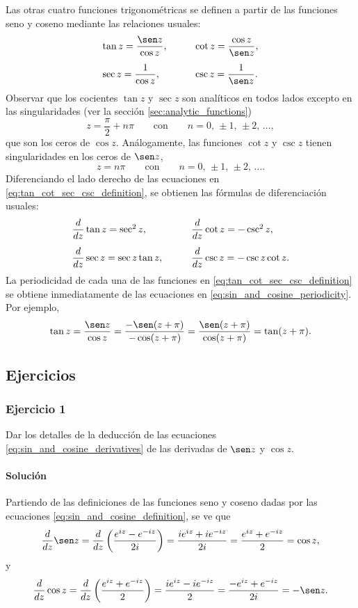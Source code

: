 \documentclass[a4paper]{report}
\begin{document}
Las otras cuatro funciones trigonométricas se definen a partir de las funciones seno y coseno mediante las relaciones usuales:
\begin{equation}\label{eq:tan_cot_sec_csc_definition}
 \begin{array}{ll}
  \tan z=\dfrac{\sen z}{\cos z}, &\qquad\cot z=\dfrac{\cos z}{\sen z},\\[\bigskipamount]
  \sec z=\dfrac{1}{\cos z}, &\qquad\csc z=\dfrac{1}{\sen z}. 
 \end{array} 
\end{equation}
Observar que los cocientes \(\tan z\) y \(\sec z\) son analíticos en todos lados excepto en las singularidades (ver la sección \ref{sec:analytic_functions})
\[
 z=\frac{\pi}{2}+n\pi
 \qquad\textrm{con}\qquad 
 n=0,\,\pm1,\,\pm2,\,\dots,
\]
que son los ceros de \(\cos z\). Análogamente, las funciones \(\cot z\) y \(\csc z\) tienen singularidades en los ceros de \(\sen z\),
\[
 z=n\pi
 \qquad\textrm{con}\qquad 
 n=0,\,\pm1,\,\pm2,\,\dots.
\]
Diferenciando el lado derecho de las ecuaciones en \ref{eq:tan_cot_sec_csc_definition}, se obtienen las fórmulas de diferenciación usuales:
\begin{equation}\label{eq:tan_cot_sec_csc_derivatives}
 \begin{array}{ll}
  \dfrac{d}{dz}\tan z=\sec^2z, &\qquad\dfrac{d}{dz}\cot z=-\csc^2z,\\[\bigskipamount]
  \dfrac{d}{dz}\sec z=\sec z\tan z, &\qquad\dfrac{d}{dz}\csc z=-\csc z\cot z. 
 \end{array} 
\end{equation}
La periodicidad de cada una de las funciones en \ref{eq:tan_cot_sec_csc_definition} se obtiene inmediatamente de las ecuaciones en \ref{eq:sin_and_cosine_periodicity}. Por ejemplo,
\[
 \tan z=\frac{\sen z}{\cos z}=\frac{-\sen(z+\pi)}{-\cos(z+\pi)}=\frac{\sen(z+\pi)}{\cos(z+\pi)}=\tan(z+\pi).
\]

\subsection*{Ejercicios}

\subsubsection{Ejercicio 1}

Dar los detalles de la deducción de las ecuaciones \ref{eq:sin_and_cosine_derivatives} de las derivadas de \(\sen z\) y \(\cos z\).

\paragraph{Solución} Partiendo de las definiciones de las funciones seno y coseno dadas por las ecuaciones \ref{eq:sin_and_cosine_definition}, se ve que 
\[
 \frac{d}{dz}\sen z=\frac{d}{dz}\left(\frac{e^{iz}-e^{-iz}}{2i}\right)
 =\frac{ie^{iz}+ie^{-iz}}{2i}=\frac{e^{iz}+e^{-iz}}{2}=\cos z,
\]
y
\[
 \frac{d}{dz}\cos z=\frac{d}{dz}\left(\frac{e^{iz}+e^{-iz}}{2}\right)
 =\frac{ie^{iz}-ie^{-iz}}{2}=\frac{-e^{iz}+e^{-iz}}{2i}=-\sen z.
\]
\end{document}
